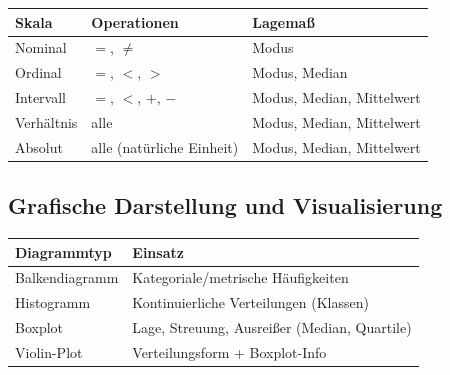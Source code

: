 \begin{center}
    \small
    \begin{tabular}{|l|l|l|}
        \hline
        \textbf{Skala} & \textbf{Operationen}      & \textbf{Lagemaß}          \\
        \hline
        Nominal        & $=$, $\neq$               & Modus                     \\
        \hline
        Ordinal        & $=$, $<$, $>$             & Modus, Median             \\
        \hline
        Intervall      & $=$, $<$, $+$, $-$        & Modus, Median, Mittelwert \\
        \hline
        Verhältnis     & alle                      & Modus, Median, Mittelwert \\
        \hline
        Absolut        & alle (natürliche Einheit) & Modus, Median, Mittelwert \\
        \hline
    \end{tabular}
\end{center}

\newpage

\subsection{Grafische Darstellung und Visualisierung}

\begin{center}
    \small
    \begin{tabular}{|l|l|}
        \hline
        \textbf{Diagrammtyp} & \textbf{Einsatz}                              \\
        \hline
        Balkendiagramm       & Kategoriale/metrische Häufigkeiten           \\
        \hline
        Histogramm           & Kontinuierliche Verteilungen (Klassen)       \\
        \hline
        Boxplot              & Lage, Streuung, Ausreißer (Median, Quartile) \\
        \hline
        Violin-Plot          & Verteilungsform + Boxplot-Info               \\
        \hline
    \end{tabular}
\end{center}

